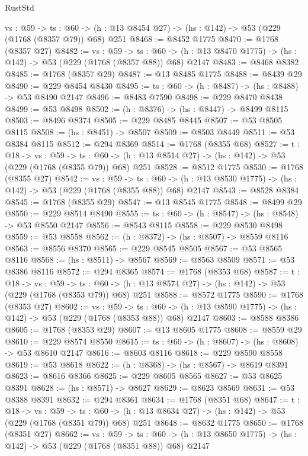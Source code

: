 \begin{lexlean}{RustStd}
\begin{coremodule}
  {vs : @59} ->
  {ts : @60} -> (h : @13 @8454 @27) -> (hs : @142) -> @53 (@229 (@1768 (@8357 @79)) @68) @251
@8468 := @8452 @1775
@8470 := @1768 (@8357 @27)
@8482 := {vs : @59} ->
  {ts : @60} -> (h : @13 @8470 @1775) -> (hs : @142) -> @53 (@229 (@1768 (@8357 @88)) @68) @2147
@8483 := @8468 @8382
@8485 := @1768 (@8357 @29)
@8487 := @13 @8485 @1775
@8488 := @8439 @29
@8490 := @229 @8454 @8430
@8495 := {ts : @60} -> (h : @8487) -> (hs : @8488) -> @53 @8490 @2147
@8496 := @8483 @7590
@8498 := @229 @8470 @8438
@8499 := @53 @8498
@8502 := (h : @8376) -> (hs : @8447) -> @8499 @8115
@8503 := @8496 @8374
@8505 := @229 @8485 @8445
@8507 := @53 @8505 @8115
@8508 := (hs : @8451) -> @8507
@8509 := @8503 @8449
@8511 := @53 @8384 @8115
@8512 := @294 @8369
@8514 := @1768 (@8355 @68)
@8527 := {t : @18} ->
  {vs : @59} ->
  {ts : @60} -> (h : @13 @8514 @27) -> (hs : @142) -> @53 (@229 (@1768 (@8355 @79)) @68) @251
@8528 := @8512 @1775
@8530 := @1768 (@8355 @27)
@8542 := {vs : @59} ->
  {ts : @60} -> (h : @13 @8530 @1775) -> (hs : @142) -> @53 (@229 (@1768 (@8355 @88)) @68) @2147
@8543 := @8528 @8384
@8545 := @1768 (@8355 @29)
@8547 := @13 @8545 @1775
@8548 := @8499 @29
@8550 := @229 @8514 @8490
@8555 := {ts : @60} -> (h : @8547) -> (hs : @8548) -> @53 @8550 @2147
@8556 := @8543 @8115
@8558 := @229 @8530 @8498
@8559 := @53 @8558
@8562 := (h : @8372) -> (hs : @8507) -> @8559 @8116
@8563 := @8556 @8370
@8565 := @229 @8545 @8505
@8567 := @53 @8565 @8116
@8568 := (hs : @8511) -> @8567
@8569 := @8563 @8509
@8571 := @53 @8386 @8116
@8572 := @294 @8365
@8574 := @1768 (@8353 @68)
@8587 := {t : @18} ->
  {vs : @59} ->
  {ts : @60} -> (h : @13 @8574 @27) -> (hs : @142) -> @53 (@229 (@1768 (@8353 @79)) @68) @251
@8588 := @8572 @1775
@8590 := @1768 (@8353 @27)
@8602 := {vs : @59} ->
  {ts : @60} -> (h : @13 @8590 @1775) -> (hs : @142) -> @53 (@229 (@1768 (@8353 @88)) @68) @2147
@8603 := @8588 @8386
@8605 := @1768 (@8353 @29)
@8607 := @13 @8605 @1775
@8608 := @8559 @29
@8610 := @229 @8574 @8550
@8615 := {ts : @60} -> (h : @8607) -> (hs : @8608) -> @53 @8610 @2147
@8616 := @8603 @8116
@8618 := @229 @8590 @8558
@8619 := @53 @8618
@8622 := (h : @8368) -> (hs : @8567) -> @8619 @8391
@8623 := @8616 @8366
@8625 := @229 @8605 @8565
@8627 := @53 @8625 @8391
@8628 := (hs : @8571) -> @8627
@8629 := @8623 @8569
@8631 := @53 @8388 @8391
@8632 := @294 @8361
@8634 := @1768 (@8351 @68)
@8647 := {t : @18} ->
  {vs : @59} ->
  {ts : @60} -> (h : @13 @8634 @27) -> (hs : @142) -> @53 (@229 (@1768 (@8351 @79)) @68) @251
@8648 := @8632 @1775
@8650 := @1768 (@8351 @27)
@8662 := {vs : @59} ->
  {ts : @60} -> (h : @13 @8650 @1775) -> (hs : @142) -> @53 (@229 (@1768 (@8351 @88)) @68) @2147

\end{coremodule}
\end{lexlean}
